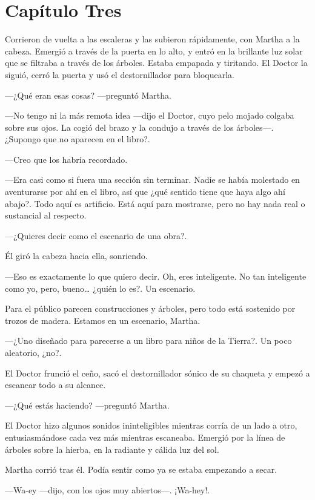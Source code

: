 \chapter*{Capítulo Tres}

Corrieron de vuelta a las escaleras y las subieron rápidamente, con Martha a la cabeza. Emergió a través de la puerta en lo alto, y entró en la brillante luz solar que se filtraba a través de los árboles. Estaba empapada y tiritando. El Doctor la siguió, cerró la puerta y usó el destornillador para bloquearla.

---¿Qué eran esas cosas? ---preguntó Martha.

---No tengo ni la más remota idea ---dijo el Doctor, cuyo pelo mojado colgaba sobre sus ojos. La cogió del brazo y la condujo a través de los árboles---. ¿Supongo que no aparecen en el libro?.

---Creo que los habría recordado.

---Era casi como si fuera una sección sin terminar. Nadie se había molestado en aventurarse por ahí en el libro, así que ¿qué sentido tiene que haya algo ahí abajo?. Todo aquí es artificio. Está aquí para mostrarse, pero no hay nada real o sustancial al respecto.

---¿Quieres decir como el escenario de una obra?.

Él giró la cabeza hacia ella, sonriendo.

---Eso es exactamente lo que quiero decir. Oh, eres inteligente. No tan inteligente como yo, pero, bueno\ldots{} ¿quién lo es?. Un escenario.

Para el público parecen construcciones y árboles, pero todo está sostenido por trozos de madera. Estamos en un escenario, Martha.

---¿Uno diseñado para parecerse a un libro para niños de la Tierra?. Un poco aleatorio, ¿no?.

El Doctor frunció el ceño, sacó el destornillador sónico de su chaqueta y empezó a escanear todo a su alcance.

---¿Qué estás haciendo? ---preguntó Martha.

El Doctor hizo algunos sonidos ininteligibles mientras corría de un lado a otro, entusiasmándose cada vez más mientras escaneaba. Emergió por la línea de árboles sobre la hierba, en la radiante y cálida luz del sol.

Martha corrió tras él. Podía sentir como ya se estaba empezando a secar.

---Wa-ey ---dijo, con los ojos muy abiertos---. ¡Wa-hey!.

